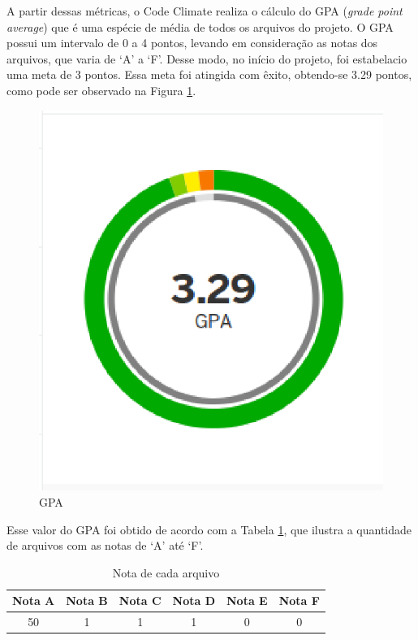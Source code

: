 \newpage

A partir dessas métricas, o Code Climate realiza o cálculo do GPA (\textit{grade point average}) que é uma espécie de média de todos os arquivos do projeto. O GPA possui um intervalo de 0 a 4 pontos, levando em consideração as notas dos arquivos, que varia de `A' a `F'. Desse modo, no início do projeto, foi estabelacio uma meta de 3 pontos. Essa meta foi atingida com êxito, obtendo-se 3.29 pontos, como pode ser observado na Figura \ref{GPA}.

\begin{figure}[!h]
	\centering
	\includegraphics[scale=0.5]{figuras/resultados/gpa.eps}
	\caption[GPA]{GPA}
	\label{GPA}
\end{figure}

Esse valor do GPA foi obtido de acordo com a Tabela \ref{gpa_arquivos}, que ilustra a quantidade de arquivos com as notas de `A' até `F'.

\begin{table}[!h]
\centering
\caption{Nota de cada arquivo}
\label{gpa_arquivos}
\begin{tabular}{cccccc}
\toprule
\textbf{Nota A} & \textbf{Nota B} & \textbf{Nota C} & \textbf{Nota D} & \textbf{Nota E} & \textbf{Nota F} \\ \midrule
50 & 1 & 1 & 1 & 0 & 0							   \\ \bottomrule
\end{tabular}
\end{table}

